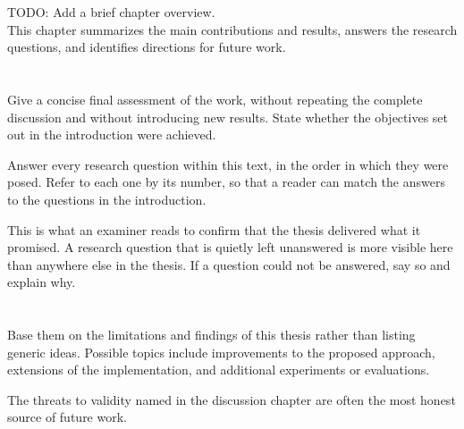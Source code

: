   {TODO: Add a brief chapter overview. \\
  This chapter summarizes the main contributions and results, answers the research questions, and identifies directions for future work.}

\section{}
\label{sec:conclusion}


Give a concise final assessment of the work, without repeating the complete discussion and without introducing new results.
State whether the objectives set out in the introduction were achieved.

Answer every research question within this text, in the order in which they were posed.
Refer to each one by its number, so that a reader can match the answers to the questions in the introduction.

This is what an examiner reads to confirm that the thesis delivered what it promised.
A research question that is quietly left unanswered is more visible here than anywhere else in the thesis.
If a question could not be answered, say so and explain why.

\section{}
\label{sec:future-work}


Base them on the limitations and findings of this thesis rather than listing generic ideas.
Possible topics include improvements to the proposed approach, extensions of the implementation, and additional experiments or evaluations.

The threats to validity named in the discussion chapter are often the most honest source of future work.
